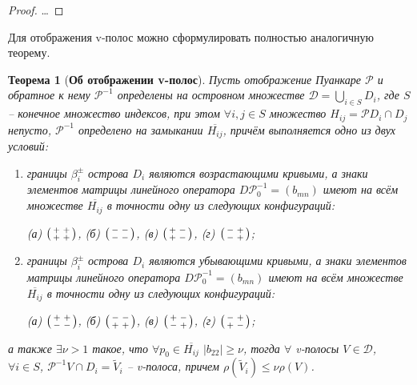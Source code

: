 \documentclass{article}
\newtheorem*{theorem}{Теорема}
\newenvironment{psm}
	{\left( \begin{smallmatrix}}
	{\end{smallmatrix} \right) }
\begin{document}
\begin{proof}
\dots
\end{proof}

Для отображения v-полос можно сформулировать полностью аналогичную теорему.

\begin{theorem}[{\bf Об отображении v-полос}]
Пусть отображение Пуанкаре $\mathcal{P}$ и обратное к нему $\mathcal{P}^{-1}$ определены на островном множестве $\mathcal{D} = \bigcup_{i \in S} D_i$, где $S$ -- конечное множество индексов, при этом $\forall i, j \in S$ множество $H_{ij} = \mathcal{P} D_i \cap D_j$ непусто, $\mathcal{P}^{-1}$ определено на замыкании $\overline{H_{ij}}$, причём выполняется одно из двух условий:
\begin{enumerate}
	\item границы $\beta_i^{\pm}$ острова $D_i$ являются возрастающими кривыми, а знаки элементов матрицы линейного оператора $D \mathcal{P}_0^{-1} = (b_{mn})$ имеют на всём множестве $\overline{H_{ij}}$ в точности одну из следующих конфигураций:
		\begin{center}
			(а) $\begin{psm} + & + \\ + & + \end{psm}$, \quad
			(б) $\begin{psm} - & - \\ - & - \end{psm}$, \quad
			(в) $\begin{psm} + & - \\ + & - \end{psm}$, \quad
			(г) $\begin{psm} - & + \\ - & + \end{psm}$;
		\end{center}
	\item границы $\beta_i^{\pm}$ острова $D_i$ являются убывающими кривыми, а знаки элементов матрицы линейного оператора $D \mathcal{P}_0^{-1} = (b_{mn})$ имеют на всём множестве $\overline{H_{ij}}$ в точности одну из следующих конфигураций:
		\begin{center}
			 (а) $\begin{psm} + & + \\ - & - \end{psm}$, \quad
			 (б) $\begin{psm} - & - \\ + & + \end{psm}$, \quad
			 (в) $\begin{psm} + & - \\ - & + \end{psm}$, \quad
			 (г) $\begin{psm} - & + \\ + & - \end{psm}$;
		\end{center}
\end{enumerate}
а также $\exists \nu > 1$ такое, что $\forall p_0 \in \overline{H_{ij}}$ $|b_{22}| \ge \nu$, тогда $\forall$ v-полосы $V \in \mathcal{D}$, $\forall i \in S$, $\mathcal{P}^{-1} V \cap D_i = \widetilde{V}_i$ -- v-полоса, причем $\rho(\widetilde{V}_i) \le \nu \rho(V)$.


\end{theorem}
\end{document}
